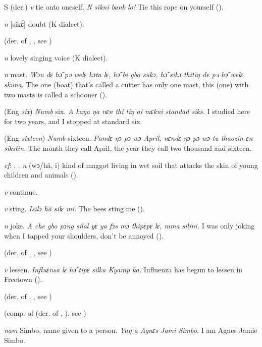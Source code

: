 \begin{letter}{S}
 (der.) \textit{v} tie onto oneself. \textit{N sïkni bank lo!} Tie this rope on yourself (\citealt{Pichl1967}). 

 \textit{n} [síkɛ́] doubt (K dialect). 

 (der. of , , see ) 

 \textit{n} lovely singing voice (K dialect). 

 \textit{n} mast. \textit{Wɔn dɛ hɔ̃ pə welɛ kɔta lɛ, hɔ̃ bi gbo sukɔ, hɔ̃ sikɔ thitïŋ de pə hɔ̃ welɛ skuna.} The one (boat) that's called a cutter has only one mast, this (one) with two masts is called a schooner (\citealt{Pichl1967}). 

 (Eng \textit{six}) \textit{Numb} six. \textit{A kaŋa ŋa nɛn thi tiŋ ai mɛkni standad siks.} I studied here for two years, and I stopped at standard six. 

 (Eng \textit{sixteen}) \textit{Numb} sixteen. \textit{Pandɛ ŋɔ pɔ wɔ April, nɛndɛ ŋɔ pɔ wɔ tu thaozin ɛn sikstin.} The month they call April, the year they call two thousand and sixteen.

 \textit{cf}: , . \textit{n} (wɔ/hã, i) kind of maggot living in wet soil that attacks the skin of young children and animals (\citealt{Pichl1967}).

 \textit{v} continue.

 \textit{v} sting. \textit{Isilɔ hã silɛ mi.} The bees sting me (\citealt{Pichl1967}).

 \textit{n} joke. \textit{A che gbo pɔng silal yɛ ya fɔs mɔ thipɛpɛ lɛ, mma silini.} I was only joking when I tapped your shoulders, don't be annoyed (\citealt{Pichl1967}). 

 (der. of , , see ) 

 \textit{v} lessen. \textit{Influɛnsa lɛ hɔ̃ tipɛ silka Kyamp ka.} Influenza has begun to lessen in Freetown (\citealt{Pichl1967}). 

 (der. of , , see )

 (comp. of  (der. of , ), see ) 

 \textit{nam} Simbo, name given to a person. \textit{Yaŋ a Agnɛs Jami Simbo.} I am Agnes Jamie Simbo.


\end{letter}
